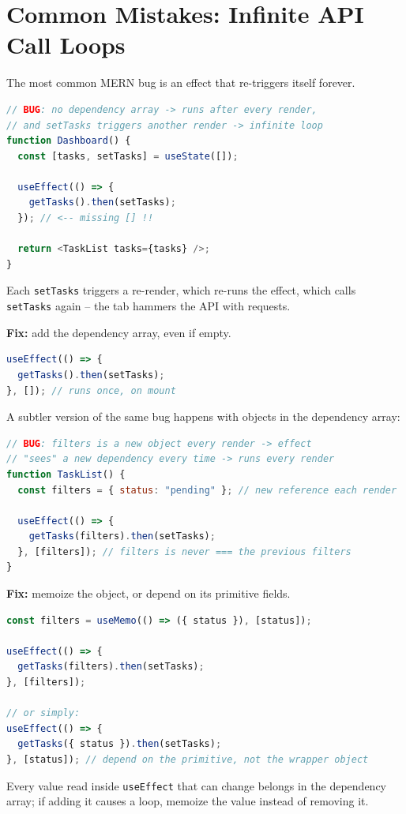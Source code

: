 \section{Common Mistakes: Infinite API Call Loops}

The most common MERN bug is an effect that re-triggers itself forever.

\begin{warnbox}
\begin{lstlisting}[language=JavaScript]
// BUG: no dependency array -> runs after every render,
// and setTasks triggers another render -> infinite loop
function Dashboard() {
  const [tasks, setTasks] = useState([]);

  useEffect(() => {
    getTasks().then(setTasks);
  }); // <-- missing [] !!

  return <TaskList tasks={tasks} />;
}
\end{lstlisting}
Each \texttt{setTasks} triggers a re-render, which re-runs the effect, which
calls \texttt{setTasks} again -- the tab hammers the API with requests.
\end{warnbox}

\textbf{Fix:} add the dependency array, even if empty.

\begin{lstlisting}[language=JavaScript]
useEffect(() => {
  getTasks().then(setTasks);
}, []); // runs once, on mount
\end{lstlisting}

A subtler version of the same bug happens with objects in the dependency
array:

\begin{warnbox}
\begin{lstlisting}[language=JavaScript]
// BUG: filters is a new object every render -> effect
// "sees" a new dependency every time -> runs every render
function TaskList() {
  const filters = { status: "pending" }; // new reference each render

  useEffect(() => {
    getTasks(filters).then(setTasks);
  }, [filters]); // filters is never === the previous filters
}
\end{lstlisting}
\end{warnbox}

\textbf{Fix:} memoize the object, or depend on its primitive fields.

\begin{lstlisting}[language=JavaScript]
const filters = useMemo(() => ({ status }), [status]);

useEffect(() => {
  getTasks(filters).then(setTasks);
}, [filters]);

// or simply:
useEffect(() => {
  getTasks({ status }).then(setTasks);
}, [status]); // depend on the primitive, not the wrapper object
\end{lstlisting}

\begin{tipbox}[TIP]
Every value read inside \texttt{useEffect} that can change belongs in the
dependency array; if adding it causes a loop, memoize the value instead of
removing it.
\end{tipbox}
